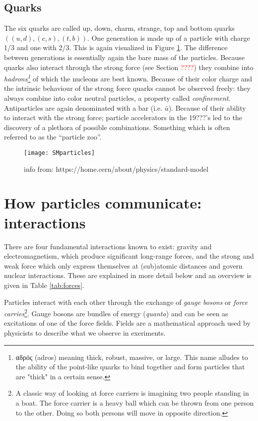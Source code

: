 \subsection{Quarks}
The six quarks are called up, down, charm, strange, top and bottom quarks $((u,d),(c,s),(t,b))$.
One generation is made up of a particle with charge 1/3 and one with 2/3. This is again visualized in Figure \ref{SMparticles}.
The difference between generations is essentially again the bare mass of the particles. Because quarks also interact through the strong force (see Section \textcolor{red}{????}) they combine into 
\textit{hadrons\footnote{\gr αδρός \en (adros) meaning thick, robust, massive, or large. This name alludes to the ability of the point-like quarks to bind together and form particles that are "thick" in a certain sense.}} of which the nucleons are best known. Because of their color charge and the intrinsic behaviour of the strong force quarks cannot be observed freely: they always combine into color neutral particles, a property called \textit{confinement}. Antiparticles are again denominated with a bar (i.e. $\bar{u}$). Because of their ability to interact with the strong force; particle accelerators in the 19???'s led to the discovery of a plethora of possible combinations. Something which is often referred to as the ``particle zoo''.

\begin{figure}
\label{SMparticles}
\texttt{[image: SMparticles]}
\caption{info from: https://home.cern/about/physics/standard-model}
\end{figure}

\section{How particles communicate: interactions}

There are four fundamental interactions known to exist: gravity and electromagnetism, which produce significant long-range forces, and the strong and weak force which only express themselves at (sub)atomic distances and govern nuclear interactions. These are explained in more detail below and an overview is given in Table \ref{tab:forces}.

Particles interact with each other through the exchange of \textit{gauge bosons} or \textit{force carries}\footnote{A classic way of looking at force carriers is imagining two people standing in a boat. The force carrier is a heavy ball which can be thrown from one person to the other. Doing so both persons will move in opposite direction.}. Gauge bosons are bundles of energy (\textit{quanta}) and can be seen as excitations of one of the force fields.
Fields are a mathematical approach used by physicists to describe what we observe in exeriments.

